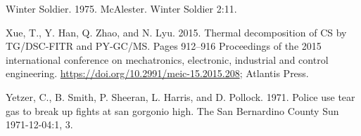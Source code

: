 \documentclass[
  11pt,
]{krantz}
\newlength{\cslhangindent}
\newenvironment{CSLReferences}[2] %
 {%
  \setlength{\parindent}{0pt}
  \ifodd #1 \everypar{\setlength{\hangindent}{\cslhangindent}}\ignorespaces\fi
  \ifnum #2 > 0
  \setlength{\parskip}{#2\baselineskip}
  \fi
 }%
 {}
\begin{document}
\begin{CSLReferences}{1}{0}
\leavevmode{}%
Winter Soldier. 1975. McAlester. Winter Soldier 2:11.

\leavevmode{}%
Xue, T., Y. Han, Q. Zhao, and N. Lyu. 2015. Thermal decomposition of CS by TG/DSC-FITR and PY-GC/MS. Pages 912--916 Proceedings of the 2015 international conference on mechatronics, electronic, industrial and control engineering. \url{https://doi.org/10.2991/meic-15.2015.208}; Atlantis Press.

\leavevmode{}%
Yetzer, C., B. Smith, P. Sheeran, L. Harris, and D. Pollock. 1971. Police use tear gas to break up fights at san gorgonio high. The San Bernardino County Sun 1971-12-04:1, 3.

\end{CSLReferences}

\printindex
\end{document}
